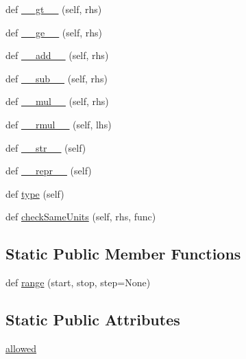 \begin{DoxyCompactItemize}
def \hyperlink{classmatplotlib_1_1testing_1_1jpl__units_1_1UnitDbl_1_1UnitDbl_a3ca2ac14db8fc66f8225c987f50cc7c9}{\+\_\+\+\_\+gt\+\_\+\+\_\+} (self, rhs)
\item 
def \hyperlink{classmatplotlib_1_1testing_1_1jpl__units_1_1UnitDbl_1_1UnitDbl_a832687e06d2e758d4be3f9b2e7e9f4f8}{\+\_\+\+\_\+ge\+\_\+\+\_\+} (self, rhs)
\item 
def \hyperlink{classmatplotlib_1_1testing_1_1jpl__units_1_1UnitDbl_1_1UnitDbl_acc1af17dadac2ff99130dc8e01e9056f}{\+\_\+\+\_\+add\+\_\+\+\_\+} (self, rhs)
\item 
def \hyperlink{classmatplotlib_1_1testing_1_1jpl__units_1_1UnitDbl_1_1UnitDbl_a602b20cc4f7314818a4a23b19c182f04}{\+\_\+\+\_\+sub\+\_\+\+\_\+} (self, rhs)
\item 
def \hyperlink{classmatplotlib_1_1testing_1_1jpl__units_1_1UnitDbl_1_1UnitDbl_ab8f35a2b0cf4a1cf5bc8c92fae695831}{\+\_\+\+\_\+mul\+\_\+\+\_\+} (self, rhs)
\item 
def \hyperlink{classmatplotlib_1_1testing_1_1jpl__units_1_1UnitDbl_1_1UnitDbl_a848e1b0f6881b392e0ebacf6bceedc66}{\+\_\+\+\_\+rmul\+\_\+\+\_\+} (self, lhs)
\item 
def \hyperlink{classmatplotlib_1_1testing_1_1jpl__units_1_1UnitDbl_1_1UnitDbl_abf0e261c0c7d233c564df780e2e97010}{\+\_\+\+\_\+str\+\_\+\+\_\+} (self)
\item 
def \hyperlink{classmatplotlib_1_1testing_1_1jpl__units_1_1UnitDbl_1_1UnitDbl_aa14713b1cec8ee357d7eed73f58a9fe6}{\+\_\+\+\_\+repr\+\_\+\+\_\+} (self)
\item 
def \hyperlink{classmatplotlib_1_1testing_1_1jpl__units_1_1UnitDbl_1_1UnitDbl_aee67b6fd065fca60b9f6436c5dce4d52}{type} (self)
\item 
def \hyperlink{classmatplotlib_1_1testing_1_1jpl__units_1_1UnitDbl_1_1UnitDbl_af05536ec5446cfd426a8032eaa31ac93}{check\+Same\+Units} (self, rhs, func)
\end{DoxyCompactItemize}
\subsection*{Static Public Member Functions}
\begin{DoxyCompactItemize}
\item 
def \hyperlink{classmatplotlib_1_1testing_1_1jpl__units_1_1UnitDbl_1_1UnitDbl_a84aea1f0b7fb4031ee623d2e77e6f2ed}{range} (start, stop, step=None)
\end{DoxyCompactItemize}
\subsection*{Static Public Attributes}
\begin{DoxyCompactItemize}
\item 
\hyperlink{classmatplotlib_1_1testing_1_1jpl__units_1_1UnitDbl_1_1UnitDbl_a7f54c38896bdcf90d0c9db33c32dbedb}{allowed}
\end{DoxyCompactItemize}


